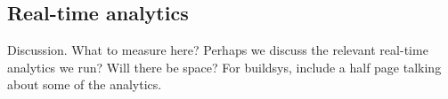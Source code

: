 \subsection{Real-time analytics}
Discussion.  What to measure here?  Perhaps we discuss the relevant real-time analytics we run?  Will there be space?  For buildsys, include a half page talking about some of the analytics.



